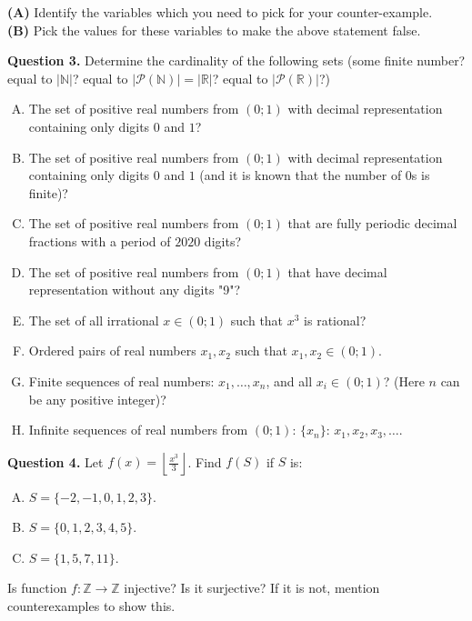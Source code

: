 \documentclass[jou]{apa6}
\begin{document}
\noindent
{\bf (A)} Identify the variables which you need to pick for your counter-example.\\
{\bf (B)} Pick the values for these variables to make the above statement false.


\vspace{6pt}
{\bf Question 3.} Determine the cardinality of the following sets (some finite number? 
equal to $|\mathbb{N}|$? equal to $|\mathcal{P}(\mathbb{N})| = |\mathbb{R}|$? equal to $|\mathcal{P}(\mathbb{R})|$?)
\begin{enumerate}[(A)]
\item The set of positive real numbers from $(0;1)$ with decimal representation 
containing only digits $0$ and $1$? 
\item The set of positive real numbers from $(0;1)$ with decimal representation 
containing only digits $0$ and $1$ (and it is known that the number of $0$s is finite)? 
\item The set of positive real numbers from $(0;1)$ that are fully periodic decimal fractions with 
a period of $2020$ digits? 
\item The set of positive real numbers from $(0;1)$ that have decimal representation 
without any digits "9"?
\item The set of all irrational $x \in (0;1)$ such that $x^3$ is rational?
\item Ordered pairs of real numbers $x_1,x_2$ such that $x_1,x_2 \in (0;1)$. 
\item Finite sequences of real numbers: $x_1,\ldots,x_n$, and all $x_i \in (0;1)$? (Here $n$ can 
be any positive integer)? 
\item Infinite sequences of real numbers from $(0;1)$: $\{ x_n \}$: $x_1,x_2,x_3,\ldots$.
\end{enumerate}


\vspace{6pt}
{\bf Question 4.}
Let ${\displaystyle f(x) = \left\lfloor \frac{x^3}{3} \right\rfloor}$. Find $f(S)$ if $S$ is:
\begin{enumerate}[(A)]
\item $S = \{ −2, −1, 0, 1, 2, 3 \}$.
\item $S = \{0, 1, 2, 3, 4, 5 \}$.
\item $S = \{1, 5, 7, 11 \}$.
\end{enumerate}
Is function $f: \mathbb{Z} \rightarrow \mathbb{Z}$ injective? Is it surjective? 
If it is not, mention counterexamples to show this. 
\end{document}
